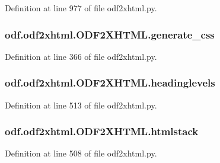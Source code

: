 Definition at line 977 of file odf2xhtml.\+py.

\hypertarget{classodf_1_1odf2xhtml_1_1ODF2XHTML_aa6e54ac722aed4b5fea0645fdd7e80c0}{
\subsubsection[{generate\+\_\+css}]{\setlength{\rightskip}{0pt plus 5cm}odf.\+odf2xhtml.\+O\+D\+F2\+X\+H\+T\+M\+L.\+generate\+\_\+css}}\label{classodf_1_1odf2xhtml_1_1ODF2XHTML_aa6e54ac722aed4b5fea0645fdd7e80c0}


Definition at line 366 of file odf2xhtml.\+py.

\hypertarget{classodf_1_1odf2xhtml_1_1ODF2XHTML_a946d65dea966349f82c6452a8ad06ca2}{
\subsubsection[{headinglevels}]{\setlength{\rightskip}{0pt plus 5cm}odf.\+odf2xhtml.\+O\+D\+F2\+X\+H\+T\+M\+L.\+headinglevels}}\label{classodf_1_1odf2xhtml_1_1ODF2XHTML_a946d65dea966349f82c6452a8ad06ca2}


Definition at line 513 of file odf2xhtml.\+py.

\hypertarget{classodf_1_1odf2xhtml_1_1ODF2XHTML_aaacf1ec312513c60f704e9f9d774915c}{
\subsubsection[{htmlstack}]{\setlength{\rightskip}{0pt plus 5cm}odf.\+odf2xhtml.\+O\+D\+F2\+X\+H\+T\+M\+L.\+htmlstack}}\label{classodf_1_1odf2xhtml_1_1ODF2XHTML_aaacf1ec312513c60f704e9f9d774915c}


Definition at line 508 of file odf2xhtml.\+py.

